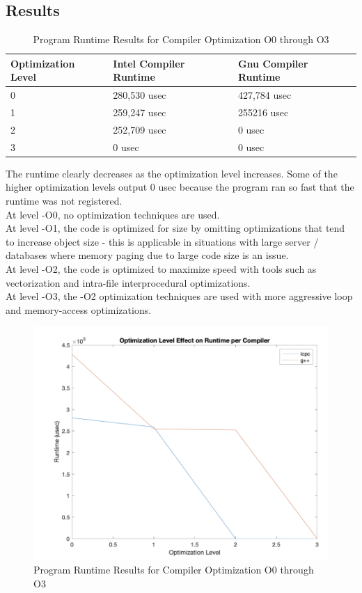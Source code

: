 \documentclass{report}
\begin{document}
\subsection*{Results}

\begin{table}[H]
\centering
\begin{tabular}{|l|l|l|}
\hline
\textbf{Optimization Level} & \textbf{Intel Compiler Runtime} & \textbf{Gnu Compiler Runtime} \\ \hline
0 & 280,530 usec & 427,784 usec \\ \hline
1 & 259,247 usec & 255216 usec \\ \hline
2 & 252,709 usec & 0 usec \\ \hline
3 & 0 usec & 0 usec \\ \hline
\end{tabular}
\caption{Program Runtime Results for Compiler Optimization O0 through O3}
\label{tab:table1}
\end{table}

The runtime clearly decreases as the optimization level increases. Some of the higher optimization levels output 0 usec because the program ran so fast that the runtime was not registered.  
\\At level -O0, no optimization techniques are used. 
\\At level -O1, the code is optimized for size by omitting optimizations that tend to increase object size - this is applicable in situations with large server / databases where memory paging due to large code size is an issue.
\\At level -O2, the code is optimized to maximize speed with tools such as vectorization and intra-file interprocedural optimizations.
\\At level -O3, the -O2 optimization techniques are used with more aggressive loop and memory-access optimizations.

\begin{figure}[H]
\centering
\includegraphics[width=.5\paperwidth]{optimization_graph.png}
\caption{Program Runtime Results for Compiler Optimization O0 through O3}
\end{figure}
\end{document}
